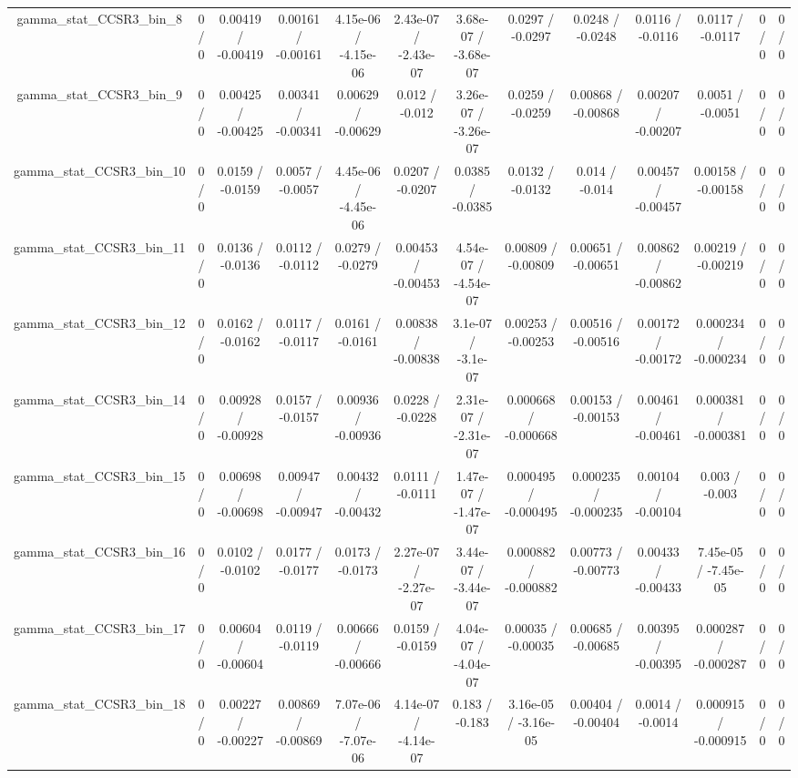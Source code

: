 \documentclass[10pt]{article}
\begin{document}
\begin{table}[htbp]
\begin{center}
\begin{tabular}{|c|c|c|c|c|c|c|c|c|c|c|c|c|}
  gamma_stat_CCSR3_bin_8 & 0 / 0 & 0.00419 / -0.00419 & 0.00161 / -0.00161 & 4.15e-06 / -4.15e-06 & 2.43e-07 / -2.43e-07 & 3.68e-07 / -3.68e-07 & 0.0297 / -0.0297 & 0.0248 / -0.0248 & 0.0116 / -0.0116 & 0.0117 / -0.0117 & 0 / 0 & 0 / 0 \\ 
  gamma_stat_CCSR3_bin_9 & 0 / 0 & 0.00425 / -0.00425 & 0.00341 / -0.00341 & 0.00629 / -0.00629 & 0.012 / -0.012 & 3.26e-07 / -3.26e-07 & 0.0259 / -0.0259 & 0.00868 / -0.00868 & 0.00207 / -0.00207 & 0.0051 / -0.0051 & 0 / 0 & 0 / 0 \\ 
  gamma_stat_CCSR3_bin_10 & 0 / 0 & 0.0159 / -0.0159 & 0.0057 / -0.0057 & 4.45e-06 / -4.45e-06 & 0.0207 / -0.0207 & 0.0385 / -0.0385 & 0.0132 / -0.0132 & 0.014 / -0.014 & 0.00457 / -0.00457 & 0.00158 / -0.00158 & 0 / 0 & 0 / 0 \\ 
  gamma_stat_CCSR3_bin_11 & 0 / 0 & 0.0136 / -0.0136 & 0.0112 / -0.0112 & 0.0279 / -0.0279 & 0.00453 / -0.00453 & 4.54e-07 / -4.54e-07 & 0.00809 / -0.00809 & 0.00651 / -0.00651 & 0.00862 / -0.00862 & 0.00219 / -0.00219 & 0 / 0 & 0 / 0 \\ 
  gamma_stat_CCSR3_bin_12 & 0 / 0 & 0.0162 / -0.0162 & 0.0117 / -0.0117 & 0.0161 / -0.0161 & 0.00838 / -0.00838 & 3.1e-07 / -3.1e-07 & 0.00253 / -0.00253 & 0.00516 / -0.00516 & 0.00172 / -0.00172 & 0.000234 / -0.000234 & 0 / 0 & 0 / 0 \\ 
  gamma_stat_CCSR3_bin_14 & 0 / 0 & 0.00928 / -0.00928 & 0.0157 / -0.0157 & 0.00936 / -0.00936 & 0.0228 / -0.0228 & 2.31e-07 / -2.31e-07 & 0.000668 / -0.000668 & 0.00153 / -0.00153 & 0.00461 / -0.00461 & 0.000381 / -0.000381 & 0 / 0 & 0 / 0 \\ 
  gamma_stat_CCSR3_bin_15 & 0 / 0 & 0.00698 / -0.00698 & 0.00947 / -0.00947 & 0.00432 / -0.00432 & 0.0111 / -0.0111 & 1.47e-07 / -1.47e-07 & 0.000495 / -0.000495 & 0.000235 / -0.000235 & 0.00104 / -0.00104 & 0.003 / -0.003 & 0 / 0 & 0 / 0 \\ 
  gamma_stat_CCSR3_bin_16 & 0 / 0 & 0.0102 / -0.0102 & 0.0177 / -0.0177 & 0.0173 / -0.0173 & 2.27e-07 / -2.27e-07 & 3.44e-07 / -3.44e-07 & 0.000882 / -0.000882 & 0.00773 / -0.00773 & 0.00433 / -0.00433 & 7.45e-05 / -7.45e-05 & 0 / 0 & 0 / 0 \\ 
  gamma_stat_CCSR3_bin_17 & 0 / 0 & 0.00604 / -0.00604 & 0.0119 / -0.0119 & 0.00666 / -0.00666 & 0.0159 / -0.0159 & 4.04e-07 / -4.04e-07 & 0.00035 / -0.00035 & 0.00685 / -0.00685 & 0.00395 / -0.00395 & 0.000287 / -0.000287 & 0 / 0 & 0 / 0 \\ 
  gamma_stat_CCSR3_bin_18 & 0 / 0 & 0.00227 / -0.00227 & 0.00869 / -0.00869 & 7.07e-06 / -7.07e-06 & 4.14e-07 / -4.14e-07 & 0.183 / -0.183 & 3.16e-05 / -3.16e-05 & 0.00404 / -0.00404 & 0.0014 / -0.0014 & 0.000915 / -0.000915 & 0 / 0 & 0 / 0 \\ 

\end{tabular}
\end{center}
\end{table}
\end{document}
